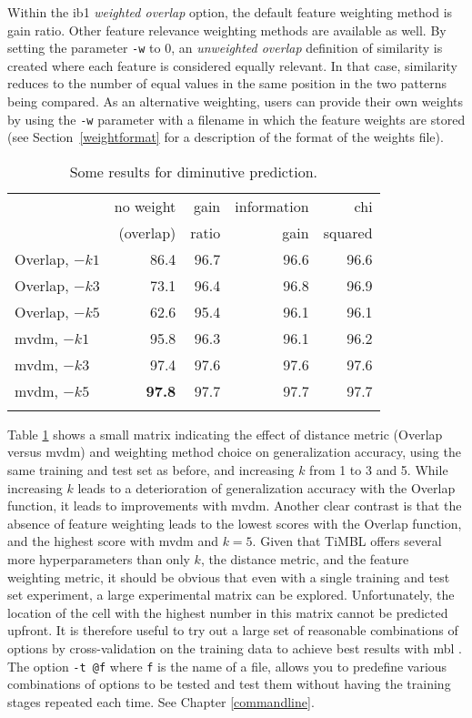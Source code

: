 \documentclass{book}
\begin{document}
Within the {\sc ib1} {\em weighted overlap}\/ option, the default
feature weighting method is gain ratio. Other feature relevance
weighting methods are available as well.  By setting the parameter
{\tt -w} to 0, an {\em unweighted overlap}\/ definition of similarity is created
where each feature is considered equally relevant. In that case, similarity reduces
to the number of equal values in the same position in the
two patterns being compared. As an alternative weighting, users can
provide their own weights by using the {\tt -w} parameter with a
filename in which the feature weights are stored (see
Section~\ref{weightformat} for a description of the format of the
weights file).

\begin{table}
\begin{center}
\begin{tabular}{l|rrrr}
             & no weight & gain  & information & chi    \\
             & (overlap) & ratio & gain        & squared \\
\noalign{\smallskip}
\hline
\noalign{\smallskip}
Overlap,  $-k1$ & 86.4 & 96.7 & 96.6 & 96.6 \\
Overlap,  $-k3$ & 73.1 & 96.4 & 96.8 & 96.9 \\
Overlap,  $-k5$ & 62.6 & 95.4 & 96.1 & 96.1 \\
\hline
\noalign{\smallskip}
{\sc mvdm}, $-k1$ & 95.8 & 96.3 & 96.1 & 96.2 \\
{\sc mvdm}, $-k3$ & 97.4 & 97.6 & 97.6 & 97.6 \\
{\sc mvdm}, $-k5$ & {\bf 97.8} & 97.7 & 97.7 & 97.7 \\
\hline
\noalign{\smallskip}
\end{tabular}
\caption{Some results for diminutive prediction.}
\label{diminresults}
\end{center}
\end{table}

Table \ref{diminresults} shows a small matrix indicating the effect of
distance metric (Overlap versus {\sc mvdm}) and weighting method
choice on generalization accuracy, using the same training and test
set as before, and increasing $k$ from 1 to 3 and 5. While increasing
$k$ leads to a deterioration of generalization accuracy with the
Overlap function, it leads to improvements with {\sc mvdm}. Another
clear contrast is that the absence of feature weighting leads to the
lowest scores with the Overlap function, and the highest score with
{\sc mvdm} and $k=5$. Given that TiMBL offers several more
hyperparameters than only $k$, the distance metric, and the feature
weighting metric, it should be obvious that even with a single
training and test set experiment, a large experimental matrix can be
explored. Unfortunately, the location of the cell with the highest
number in this matrix cannot be predicted upfront. It is therefore
useful to try out a large set of reasonable combinations of options by
cross-validation on the training data to achieve best results with
{\sc mbl} \cite{VandenBosch04b}. The option {\tt -t @f} where {\tt f}
is the name of a file, allows you to predefine various combinations of
options to be tested and test them without having the training stages
repeated each time. See Chapter \ref{commandline}.
\end{document}
